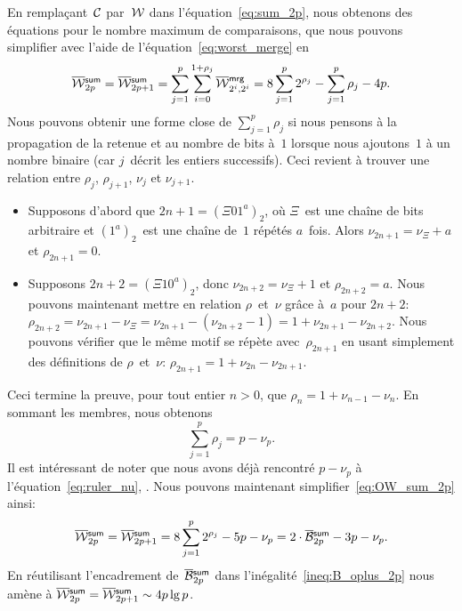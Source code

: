 En remplaçant~\(\mathcal{C}\) par~\(\mathcal{W}\) dans
l'équation~\eqref{eq:sum_2p}, nous obtenons des équations pour le
nombre maximum de comparaisons, que nous pouvons simplifier avec
l'aide de l'équation~\eqref{eq:worst_merge} 
en
\begin{equation}
\OW{\fun{sum}}{2p}
  = \OW{\fun{sum}}{2p+1}
  = \sum_{j=1}^{p}\sum_{i=0}^{1+\rho_{j}}{\OW{\fun{mrg}}{2^i,2^i}}
  = 8\sum_{j=1}^{p}{2^{\rho_j}} - \sum_{j=1}^{p}\rho_j - 4p.
\label{eq:OW_sum_2p}
\index{sum@$\OW{\fun{sum}}{n}$}
\end{equation}
Nous pouvons obtenir une forme close de
\(\sum_{j=1}^{p}\rho_j\) si nous pensons à la propagation de la
retenue et au nombre de bits à~\(1\) lorsque nous ajoutons~\(1\) à un
nombre binaire (car \(j\)~décrit les entiers successifs). Ceci revient
à trouver une relation entre \(\rho_j\), \(\rho_{j+1}\), \(\nu_j\) et
\(\nu_{j+1}\).
\begin{itemize}

  \item Supposons d'abord que \(2n+1 = (\Xi 01^a)_2\), où \(\Xi\)~est
  une chaîne de bits arbitraire et \((1^a)_2\)~est une chaîne de~\(1\)
  répétés \(a\)~fois. Alors \(\nu_{2n+1} = \nu_{\Xi} + a\) et
  \(\rho_{2n+1} = 0\).

  \item Supposons \(2n+2 = (\Xi 10^a)_2\), donc \(\nu_{2n+2} = \nu_{\Xi}
  + 1\) et \(\rho_{2n+2} = a\). Nous pouvons maintenant mettre en
  relation \(\rho\)~et~\(\nu\) grâce à~\(a\) pour \(2n+2\):
  \(\rho_{2n+2} = \nu_{2n+1} - \nu_{\Xi} = \nu_{2n+1} - (\nu_{2n+2} -
  1) = 1 + \nu_{2n+1} - \nu_{2n+2}\). Nous pouvons vérifier que le
  même motif se répète avec~\(\rho_{2n+1}\) en usant simplement des
  définitions de \(\rho\)~et~\(\nu\): \(\rho_{2n+1} = 1 + \nu_{2n} -
  \nu_{2n+1}\).

\end{itemize}
Ceci termine la preuve, pour tout entier \(n>0\), que \(\rho_n = 1 +
\nu_{n-1} - \nu_{n}\). En sommant les membres, nous obtenons
\begin{equation*}
\sum_{j=1}^{p}{\rho_j} = p - \nu_p.
\end{equation*}
Il est intéressant de noter que nous avons déjà rencontré \(p -
\nu_p\)  à l'équation~\eqref{eq:ruler_nu},
. Nous pouvons maintenant
simplifier~\eqref{eq:OW_sum_2p} ainsi:
\begin{equation*}
\OW{\fun{sum}}{2p}
 = \OW{\fun{sum}}{2p+1}
 = 8\sum_{j=1}^{p}{2^{\rho_j}} - 5p - \nu_p
 = 2 \cdot \OB{\fun{sum}}{2p} - 3p - \nu_p.
\index{sum@$\OW{\fun{sum}}{n}$}
\end{equation*}
En réutilisant l'encadrement de~\(\OB{\fun{sum}}{2p}\) dans
l'inégalité~\eqref{ineq:B_oplus_2p} nous amène à \(\OW{\fun{sum}}{2p}
= \OW{\fun{sum}}{2p+1} \sim 4p\lg p\).

